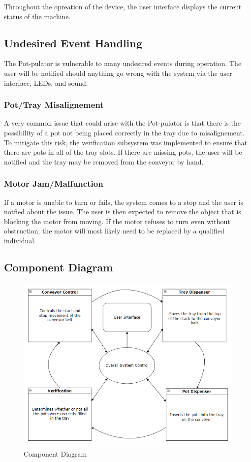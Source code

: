 \documentclass[12pt, titlepage]{article}
\begin{document}
\noindent Throughout the opreation of the device, the user interface displays the current status of the machine.

\subsection{Undesired Event Handling}
The Pot-pulator is vulnerable to many undesired events during operation. The user will be notified should anything
go wrong with the system via the user interface, LEDs, and sound.
\subsubsection{Pot/Tray Misalignement}
A very common issue that could arise with the Pot-pulator is that there is the possibility
of a pot not being placed correctly in the tray due to misalignement. To mitigate this risk,
the verification subsystem was implemented to ensure that there are pots in all of the tray slots.
If there are missing pots, the user will be notified and the tray may be removed from the conveyor by hand.

\subsubsection{Motor Jam/Malfunction}
If a motor is unable to turn or fails, the system comes to a stop and the user is notfied about the issue.
The user is then expected to remove the object that is blocking the motor from moving. If the motor refuses to turn even without obstruction,
the motor will most likely need to be replaced by a qualified individual.


\subsection{Component Diagram}
\begin{figure}[H]
  \centering
  \includegraphics[width=\linewidth]{component_diagram.PNG}
  \caption{Component Diagram}
  \label{fig:componentdiagram}
\end{figure}
\end{document}

